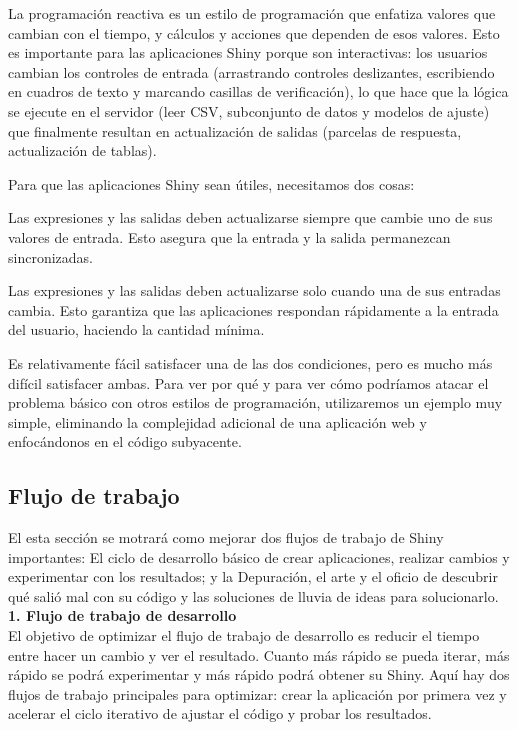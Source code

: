 La programación reactiva es un estilo de programación que enfatiza valores que cambian con el tiempo, y cálculos y acciones que dependen de esos valores. Esto es importante para las aplicaciones Shiny porque son interactivas: los usuarios cambian los controles de entrada (arrastrando controles deslizantes, escribiendo en cuadros de texto y marcando casillas de verificación), lo que hace que la lógica se ejecute en el servidor (leer CSV, subconjunto de datos y modelos de ajuste) que finalmente resultan en actualización de salidas (parcelas de respuesta, actualización de tablas).

Para que las aplicaciones Shiny sean útiles, necesitamos dos cosas:

Las expresiones y las salidas deben actualizarse siempre que cambie uno de sus valores de entrada. Esto asegura que la entrada y la salida permanezcan sincronizadas.

Las expresiones y las salidas deben actualizarse solo cuando una de sus entradas cambia. Esto garantiza que las aplicaciones respondan rápidamente a la entrada del usuario, haciendo la cantidad mínima.

Es relativamente fácil satisfacer una de las dos condiciones, pero es mucho más difícil satisfacer ambas. Para ver por qué y para ver cómo podríamos atacar el problema básico con otros estilos de programación, utilizaremos un ejemplo muy simple, eliminando la complejidad adicional de una aplicación web y enfocándonos en el código subyacente.


\subsection{Flujo de trabajo}

El esta sección se motrará como mejorar dos flujos de trabajo de Shiny importantes: El ciclo de desarrollo básico de crear aplicaciones, realizar cambios y experimentar con los resultados; y la Depuración, el arte y el oficio de descubrir qué salió mal con su código y las soluciones de lluvia de ideas para solucionarlo.\\


\textbf{1.\hspace{1cm} Flujo de trabajo de desarrollo}\\


El objetivo de optimizar el flujo de trabajo de desarrollo es reducir el tiempo entre hacer un cambio y ver el resultado. Cuanto más rápido se pueda iterar, más rápido se podrá experimentar y más rápido podrá obtener su Shiny. Aquí hay dos flujos de trabajo principales para optimizar: crear la aplicación por primera vez y acelerar el ciclo iterativo de ajustar el código y probar los resultados.


